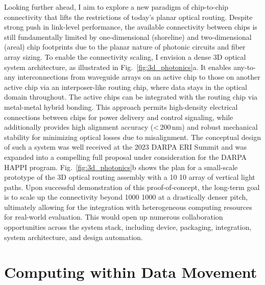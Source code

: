 Looking further ahead, I aim to explore a new paradigm of chip-to-chip connectivity that lifts the restrictions of today's planar optical routing. Despite strong push in link-level performance, the available connectivity between chips is still fundamentally limited by one-dimensional (shoreline) and two-dimensional (areal) chip footprints due to the planar nature of photonic circuits and fiber array sizing. To enable the connectivity scaling, I envision a dense 3D optical system architecture, as illustrated in Fig.~\ref{fig:3d_photonics}a. It enables any-to-any interconnections from waveguide arrays on an active chip to those on another active chip via an interposer-like routing chip, where data stays in the optical domain throughout. The active chips can be integrated with the routing chip via metal-metal hybrid bonding. This approach permits high-density electrical connections between chips for power delivery and control signaling, while
additionally provides high alignment accuracy (<\,200\,nm) and robust mechanical stability for minimizing optical losses due to misalignment. The conceptual design of such a system was well received at the 2023 DARPA ERI Summit and was expanded into a compelling full proposal under consideration for the DARPA HAPPI program. Fig.~\ref{fig:3d_photonics}b shows the plan for a small-scale prototype of the 3D optical routing assembly with a 10 \texttimes{} 10 array of vertical light paths. Upon successful demonstration of this proof-of-concept, the long-term goal is to scale up the connectivity beyond 1000 \texttimes{} 1000 at a drastically denser pitch, ultimately allowing for the integration with heterogeneous computing resources for real-world evaluation. This would open up numerous collaboration opportunities across the system stack, including device, packaging, integration, system architecture, and design automation.

\section*{Computing within Data Movement}